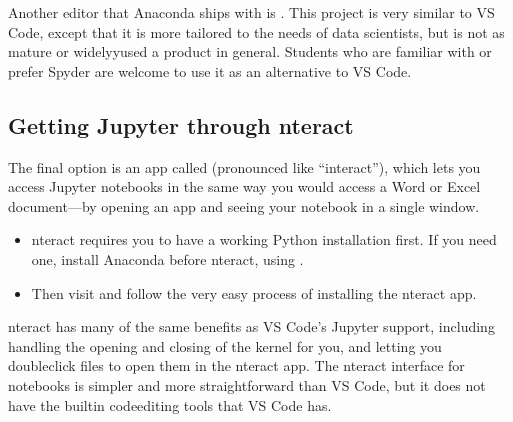 \documentclass[letterpaper,10pt,english]{jupyterBook}
\begin{document}
\sphinxAtStartPar
Another editor that Anaconda ships with is .  This project is very similar to VS Code, except that it is more tailored to the needs of data scientists, but is not as mature or widelyy\sphinxhyphen{}used a product in general.  Students who are familiar with or prefer Spyder are welcome to use it as an alternative to VS Code.


\subsection{Getting Jupyter through nteract}
\label{\detokenize{chapter-3-jupyter:getting-jupyter-through-nteract}}
\sphinxAtStartPar
The final option is an app called  (pronounced like “interact”), which lets you access Jupyter notebooks in the same way you would access a Word or Excel document—by opening an app and seeing your notebook in a single window.
\begin{itemize}
\item {} 
\sphinxAtStartPar
nteract requires you to have a working Python installation first.  If you need one, install Anaconda before nteract, using {\hyperref[\detokenize{anaconda-installation::doc}]{}}.

\item {} 
\sphinxAtStartPar
Then visit  and follow the very easy process of installing the nteract app.

\end{itemize}

\sphinxAtStartPar
nteract has many of the same benefits as VS Code’s Jupyter support, including handling the opening and closing of the kernel for you, and letting you double\sphinxhyphen{}click  files to open them in the nteract app.  The nteract interface for notebooks is simpler and more straightforward than VS Code, but it does not have the built\sphinxhyphen{}in code\sphinxhyphen{}editing tools that VS Code has.
\end{document}

